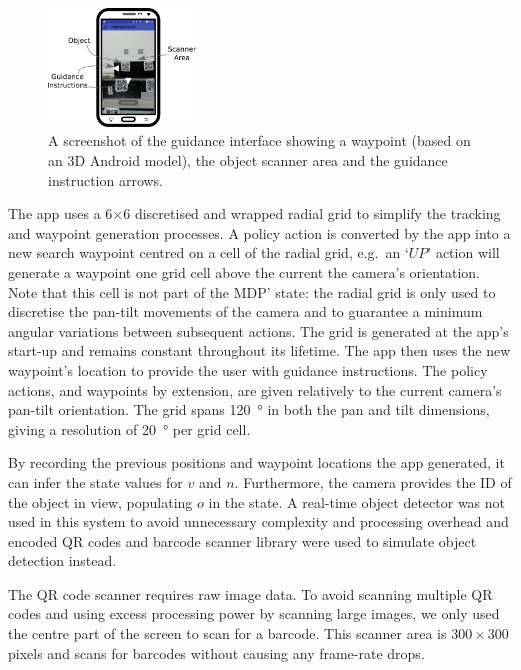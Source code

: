 \documentclass[a4paper, twoside]{article}
\begin{document}
\begin{figure}
  \centering
  \includegraphics[width=0.35\textwidth]{figures/system_screenshot2.png}
  \caption{A screenshot of the guidance interface showing a waypoint (based on an 3D Android model), the object scanner area and the guidance instruction arrows. }\label{fig:system-screenshot}
\end{figure}

The app uses a 6$\times$6 discretised and wrapped radial grid to simplify the tracking and waypoint generation processes. A policy action is converted by the app into a new search waypoint centred on a cell of the radial grid, e.g.\ an `$UP$' action will generate a waypoint one grid cell above the current the camera's orientation. Note that this cell is not part of the MDP' state: the radial grid is only used to discretise the pan-tilt movements of the camera and to guarantee a minimum angular variations between subsequent actions. The grid is generated at the app's start-up and remains constant throughout its lifetime. The app then uses the new waypoint's location to provide the user with guidance instructions. The policy actions, and waypoints by extension, are given relatively to the current camera's pan-tilt orientation. The grid spans \SI{120}{\degree} in both the pan and tilt dimensions, giving a resolution of \SI{20}{\degree} per grid cell. 

By recording the previous positions and waypoint locations the app generated, it can infer the state values for $v$ and $n$. Furthermore, the camera provides the ID of the object in view, populating $o$ in the state. A real-time object detector was not used in this system to avoid unnecessary complexity and processing overhead and encoded QR codes and barcode scanner library were used to simulate object detection instead. 

The QR code scanner requires raw image data. To avoid scanning multiple QR codes and using excess processing power by scanning large images, we only used the centre part of the screen to scan for a barcode. This scanner area is $300\times300$ pixels and scans for barcodes without causing any frame-rate drops.  
\end{document}
